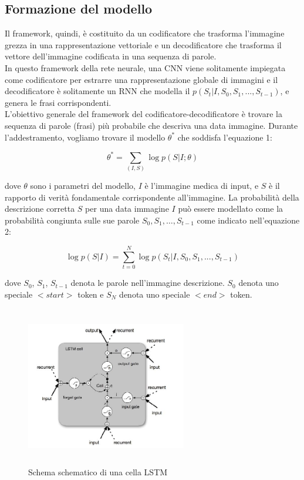 \documentclass[12pt,a4paper]{report}
\begin{document}
\subsection{Formazione del modello}
Il framework, quindi, è costituito da un codificatore che trasforma l'immagine grezza in una rappresentazione vettoriale e un decodificatore che trasforma il vettore dell'immagine codificata in una sequenza di parole.\\
In questo framework della rete neurale, una CNN viene solitamente impiegata come codificatore per estrarre una rappresentazione globale di immagini e il decodificatore è solitamente un RNN che modella il $p(S_t|I, S_0, S_1, . . . ,S_{t-1})$, e genera le frasi corrispondenti.\\
L'obiettivo generale del framework del codificatore-decodificatore è trovare la sequenza di parole (frasi) più probabile che descriva una data immagine. Durante l'addestramento, vogliamo trovare il modello $\theta^*$ che soddisfa l’equazione 1:

\begin{equation}
{\displaystyle \theta^* =  \sum\limits_{(I, S)} \log p(S | I; \theta)}
\end{equation}

dove $\theta$ sono i parametri del modello, $I$ è l'immagine medica di input, e $S$ è il rapporto di verità fondamentale corrispondente all'immagine. La probabilità della descrizione corretta $S$ per una data immagine $I$ può essere modellato come la probabilità congiunta sulle sue parole $S_0, S_1, … ,S_{t-1}$ come indicato nell'equazione 2:

\begin{equation}
{\displaystyle \log p(S|I) =  \sum\limits_{t = 0}^{N} \log p(S_t | I, S_0, S_1, ..., S_{t-1})}
\end{equation}

dove $S_0$, $S_1$, $S_{t-1}$ denota le parole nell'immagine descrizione. $S_0$ denota uno speciale $<start>$ token e $S_N$ denota uno speciale $<end>$ token.

\begin{figure}[h!]
    \begin{center}
        \includegraphics[width=7cm,height=7cm,keepaspectratio]{diagram_LSTM}
    \end{center}
    \caption{Schema schematico di una cella LSTM}
    \label{fig:LSTM-schema}
\end{figure}
\end{document}
